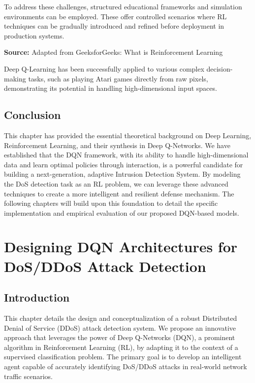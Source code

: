 \documentclass[16pt]{report}
\begin{document}
To address these challenges, structured educational frameworks and simulation environments can be employed. These offer controlled scenarios where RL techniques can be gradually introduced and refined before deployment in production systems.


\noindent\textbf{Source:} Adapted from GeeksforGeeks: What is Reinforcement Learning


Deep Q-Learning has been successfully applied to various complex decision-making tasks, such as playing Atari games directly from raw pixels, demonstrating its potential in handling high-dimensional input spaces.



\section{Conclusion}
This chapter has provided the essential theoretical background on Deep Learning, Reinforcement Learning, and their synthesis in Deep Q-Networks. We have established that the DQN framework, with its ability to handle high-dimensional data and learn optimal policies through interaction, is a powerful candidate for building a next-generation, adaptive Intrusion Detection System. By modeling the DoS detection task as an RL problem, we can leverage these advanced techniques to create a more intelligent and resilient defense mechanism. The following chapters will build upon this foundation to detail the specific implementation and empirical evaluation of our proposed DQN-based models.

\chapter{Designing DQN Architectures for DoS/DDoS Attack Detection}
\section{Introduction}

This chapter details the design and conceptualization of a robust Distributed Denial of Service (DDoS) attack detection system. We propose an innovative approach that leverages the power of Deep Q-Networks (DQN), a prominent algorithm in Reinforcement Learning (RL), by adapting it to the context of a supervised classification problem. The primary goal is to develop an intelligent agent capable of accurately identifying DoS/DDoS attacks in real-world network traffic scenarios.
\end{document}
